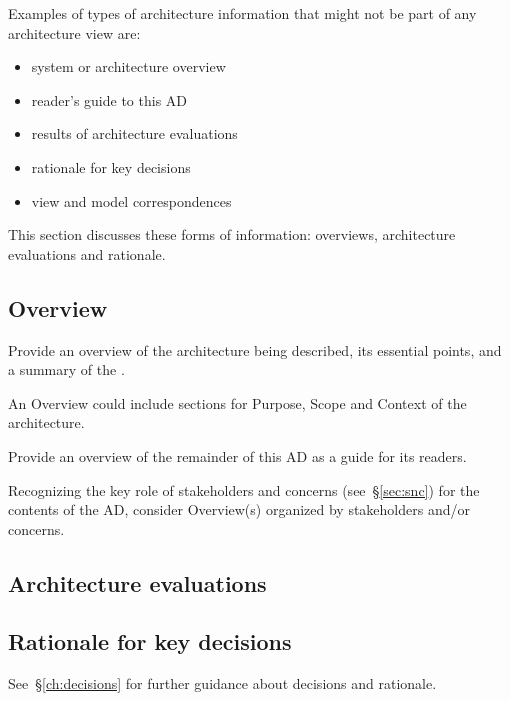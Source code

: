 \documentclass[10pt,oneside]{report}
\begin{document}
Examples of types of architecture information that might not be part
of any architecture view are:
\begin{itemize}
\item system or architecture overview
\item reader's guide to this AD
\item results of architecture evaluations
\item rationale for key decisions
\item view and model correspondences 
\end{itemize}

This section discusses these forms of information: overviews,
architecture evaluations and rationale.



\subsection{Overview \Optional}
Provide an overview of the architecture being described,
its essential points, and a summary of the
.

An Overview could include sections for Purpose, Scope and Context of the architecture.

Provide an overview of the remainder of this AD as a guide for its
readers.

Recognizing the key role of stakeholders and concerns
(see~\S\ref{sec:snc}) for the contents of the AD, consider Overview(s)
organized by stakeholders and/or concerns.


\subsection{Architecture evaluations}



\subsection{Rationale for key decisions}


See~\S\ref{ch:decisions} for further guidance about decisions and rationale.
\end{document}
